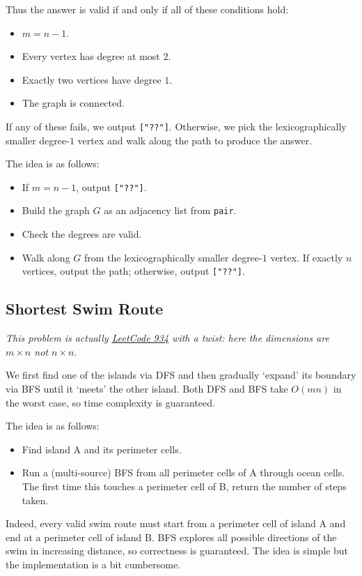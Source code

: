 \documentclass[12pt]{article}
\renewcommand{\t}{\texttt}
\begin{document}
Thus the answer is valid if and only if all of these conditions hold:
\begin{itemize}
    \item $m=n-1$.
    \item Every vertex has degree at most $2$.
    \item Exactly two vertices have degree $1$.
    \item The graph is connected.
\end{itemize}

If any of these fails, we output \t{["??"]}. Otherwise, we pick the lexicographically smaller degree-$1$ vertex and walk along the path to produce the answer.

The idea is as follows:
\begin{itemize}
    \item If $m=n-1$, output \t{["??"]}.
    \item Build the graph $G$ as an adjacency list from \t{pair}.
    \item Check the degrees are valid.
    \item Walk along $G$ from the lexicographically smaller degree-$1$ vertex. If exactly $n$ vertices, output the path; otherwise, output \t{["??"]}.
\end{itemize}
\subsection{Shortest Swim Route}
\textit{This problem is actually \href{https://leetcode.com/problems/shortest-bridge/}{LeetCode 934} with a twist: here the dimensions are $m\times n$ not $n\times n$.}

We first find one of the islands via DFS and then gradually `expand' its boundary via BFS until it `meets' the other island. Both DFS and BFS take $O(mn)$ in the worst case, so time complexity is guaranteed.

The idea is as follows:
\begin{itemize}
    \item Find island A and its perimeter cells.
    \item Run a (multi-source) BFS from all perimeter cells of A through ocean cells. The first time this touches a perimeter cell of B, return the number of steps taken.
\end{itemize}

Indeed, every valid swim route must start from a perimeter cell of island A and end at a perimeter cell of island B. BFS explores all possible directions of the swim in increasing distance, so correctness is guaranteed. The idea is simple but the implementation is a bit cumbersome.
\newpage
\end{document}
